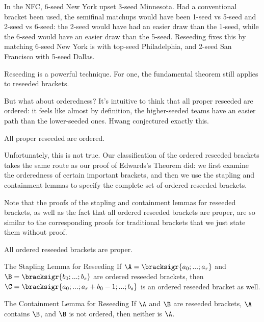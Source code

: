 {

In the NFC, 6-seed New York upset 3-seed Minnesota. Had a conventional bracket been used, the semifinal matchups would have been 1-seed vs 5-seed and 2-seed vs 6-seed: the 2-seed would have had an easier draw than the 1-seed, while the 6-seed would have an easier draw than the 5-seed. Reseeding fixes this by matching 6-seed New York is with top-seed Philadelphia, and 2-seed San Francisco with 5-seed Dallas.

Reseeding is a powerful technique. For one, the fundamental theorem still applies to reseeded brackets.


But what about orderedness? It's intuitive to think that all proper reseeded are ordered: it feels like almost by definition, the higher-seeded teams have an easier path than the lower-seeded ones. Hwang \cite{reseeding} conjectured exactly this.

\begin{conj}{}{}
    All proper reseeded are ordered.
\end{conj}

Unfortunately, this is not true. Our classification of the ordered reseeded brackets takes the same route as our proof of Edwards's Theorem did: we first examine the orderedness of certain important brackets, and then we use the stapling and containment lemmas to specify the complete set of ordered reseeded brackets.

Note that the proofs of the stapling and containment lemmas for reseeded brackets, as well as the fact that all ordered reseeded brackets are proper, are so similar to the corresponding proofs for traditional brackets that we just state them without proof. 

\begin{theorem}{}{}
    All ordered reseeded brackets are proper.
\end{theorem}
\begin{lemma}{The Stapling Lemma for Reseeding}{}
    If $\A = \bracksigr{a_0; ...; a_r}$ and $\B = \bracksigr{b_0; ...; b_s}$ are ordered reseeded brackets, then $\C = \bracksigr{a_0; ...; a_r + b_0 - 1; ...; b_s}$ is an ordered reseeded bracket as well.
\end{lemma}
\begin{lemma}{The Containment Lemma for Reseeding}{}
    If $\A$ and $\B$ are reseeded brackets, $\A$ contains $\B$, and $\B$ is not ordered, then neither is $\A$.
\end{lemma}

}
